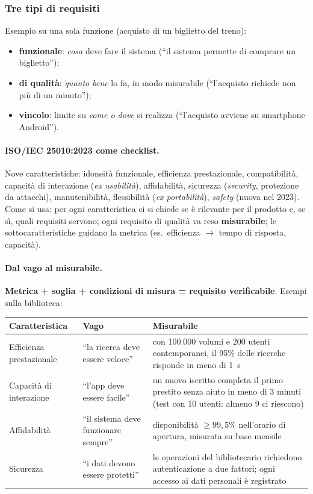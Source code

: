 \documentclass[a4paper,12pt]{article}
\begin{document}
\subsubsection{Tre tipi di requisiti}
Esempio su una sola funzione (acquisto di un biglietto del treno):
\begin{itemize}
  \item \textbf{funzionale}: \emph{cosa} deve fare il sistema (``il sistema permette di
        comprare un biglietto'');
  \item \textbf{di qualità}: \emph{quanto bene} lo fa, in modo misurabile (``l'acquisto
        richiede non più di un minuto'');
  \item \textbf{vincolo}: limite su \emph{come o dove} si realizza (``l'acquisto avviene su
        smartphone Android'').
\end{itemize}

\paragraph{ISO/IEC 25010:2023 come checklist.} Nove caratteristiche: idoneità funzionale,
efficienza prestazionale, compatibilità, capacità di interazione (\emph{ex usabilità}),
affidabilità, sicurezza (\emph{security}, protezione da attacchi), manutenibilità,
flessibilità (\emph{ex portabilità}), \emph{safety} (nuova nel 2023). Come si usa: per ogni
caratteristica ci si chiede se è rilevante per il prodotto e, se sì, quali requisiti servono;
ogni requisito di qualità va reso \textbf{misurabile}; le sottocaratteristiche guidano la
metrica (es.\ efficienza $\to$ tempo di risposta, capacità).

\paragraph{Dal vago al misurabile.} \textbf{Metrica + soglia + condizioni di misura =
requisito verificabile}. Esempi sulla biblioteca:
\begin{center}
\small
\begin{tabular}{|p{2.8cm}|p{3.6cm}|p{8.2cm}|}
\hline
\textbf{Caratteristica} & \textbf{Vago} & \textbf{Misurabile}\\
\hline
Efficienza prestazionale & ``la ricerca deve essere veloce'' & con 100.000 volumi e 200
utenti contemporanei, il 95\% delle ricerche risponde in meno di 1~s\\
\hline
Capacità di interazione & ``l'app deve essere facile'' & un nuovo iscritto completa il primo
prestito senza aiuto in meno di 3 minuti (test con 10 utenti: almeno 9 ci riescono)\\
\hline
Affidabilità & ``il sistema deve funzionare sempre'' & disponibilità $\ge 99{,}5\%$
nell'orario di apertura, misurata su base mensile\\
\hline
Sicurezza & ``i dati devono essere protetti'' & le operazioni del bibliotecario richiedono
autenticazione a due fattori; ogni accesso ai dati personali è registrato\\
\hline
\end{tabular}
\end{center}
\end{document}
